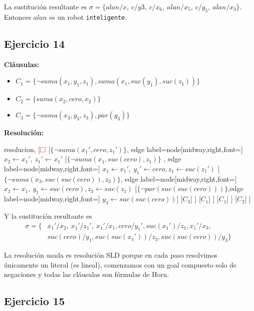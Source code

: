\documentclass[10pt,a4paper]{article}
\begin{document}
La sustitución resultante es $\sigma = \{ alan/x,~c/y3,~c/x_6,~alan/x_5,~c/y_5,~alan/x_3\}$. Entonces $alan$ es un robot \texttt{inteligente}.

\subsection{Ejercicio 14}
\textbf{Cláusulas:}
\begin{itemize}
\item $C_1 = \{\lnot suma(x_1,y_1,z_1), suma(x_1,suc(y_1),suc(z_1))\}$
\item $C_2 =\{suma(x_2,cero,x_2)\}$
\item $C_3 =\{\lnot suma(x_3,y_3,z_3), par(y_3)\}$
\end{itemize}

\textbf{Resolución:}
\begin{center}
	\begin{forest} resolucion,
[${\color{red}\Box}$ 
        	[$\{\lnot suma(x_1'\comma cero\comma z_1')\}$,
            edge label={node[midway,right,font=\footnotesize] {$x_2\leftarrow x_1',~z_1' \leftarrow x_1'$}}
            	[$\{\lnot suma(x_1\comma suc(cero)\comma z_1)\}$
            	, edge label={node[midway,right,font=\footnotesize] {$x_1\leftarrow x_1',~y_1'\leftarrow cero, z_1 \leftarrow suc(z_1')$}}
                	[$\{\lnot suma(x_3 \comma suc(suc(cero)) \comma z_3)\}$, edge label={node[midway,right,font=\footnotesize] {$x_3\leftarrow x_1,~y_1\leftarrow suc(cero), z_3\leftarrow suc(z_1)$}}
                    	[$\{\lnot par(suc(suc(cero)))\}$,edge label={node[midway,right,font=\footnotesize] {$y_3\leftarrow suc(suc(cero))$}}]
                    	[$C_3$]
                	]
                	[$C_1$]
            	]
            	[$C_1$]
        	]
        	[$C_2$]
]
	\end{forest}
\end{center}

Y la sustitución resultante es 
\begin{align*}
\sigma = \{ &x_1'/x_2,~x_1'/z_1',~x_1'/x_1, cero/y_1', suc(x_1')/z_1, x_1'/x_3, \\ &suc(cero)/y_1, suc(suc(x_1'))/z_3, suc(suc(cero))/y_3\}
\end{align*}

La resolución usada es resolución SLD porque en cada paso resolvimos únicamente un literal (es lineal), comenzamos con un goal compuesto solo de negaciones y todas las cláusulas son fórmulas de Horn.

\subsection{Ejercicio 15}
\end{document}
